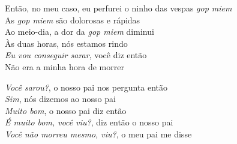  \smallskip
 \begin{center}\end{center}
 \smallskip
 
\noindent Então, no meu caso, eu perfurei o ninho das vespas \textit{gop miem}\\
 As \textit{gop miem} são dolorosas e rápidas\\
 Ao meio-dia, a dor da \textit{gop miem} diminui\\
 Às duas horas, nós estamos rindo\\
 \textit{Eu vou conseguir sarar}, você diz então\\
 Não era a minha hora de morrer
 
 \smallskip
 \begin{center}\end{center}
 \smallskip
 
\noindent \textit{Você sarou?}, o nosso pai nos pergunta então\\
 \textit{Sim}, nós dizemos ao nosso pai\\
 \textit{Muito bom}, o nosso pai diz então\\
 \textit{É muito bom, você viu?}, diz então o nosso pai\\
 \textit{Você não morreu mesmo, viu?}, o meu pai me disse
 
 \smallskip
 \begin{center}\end{center}
 \smallskip
 
